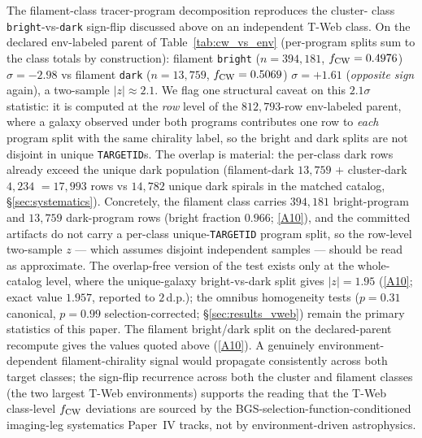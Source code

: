 \documentclass[aps,prd,twocolumn,superscriptaddress,showpacs,preprintnumbers,nofootinbib,longbibliography,floatfix]{revtex4-2}
\newcommand{\repoBase}{https://github.com/Hubify-Projects/bigbounce/blob/main}
\begin{document}
The filament-class tracer-program decomposition reproduces the cluster-
class \texttt{bright}-vs-\texttt{dark} sign-flip discussed above on an
independent T-Web class. On the declared env-labeled parent of
Table~\ref{tab:cw_vs_env} (per-program splits sum to the class totals
by construction): filament \texttt{bright} ($n = 394{,}181$,
$f_{\rm CW} = 0.4976$) $\sigma = -2.98$ vs filament \texttt{dark}
($n = 13{,}759$, $f_{\rm CW} = 0.5069$)
$\sigma = +1.61$ (\emph{opposite sign} again), a two-sample
$|z| \approx 2.1$. We flag one structural caveat on this $2.1\sigma$
statistic: it is computed at the \emph{row} level of the
$812{,}793$-row env-labeled parent, where a galaxy observed under
both programs contributes one row to \emph{each} program split with
the same chirality label, so the bright and dark splits are not
disjoint in unique \texttt{TARGETID}s. The overlap is material: the
per-class dark rows already exceed the unique dark population
(filament-dark $13{,}759$ $+$ cluster-dark $4{,}234$ $= 17{,}993$
rows vs $14{,}782$ unique dark spirals in the matched catalog,
\S\ref{sec:systematics}). Concretely, the filament class carries
$394{,}181$ bright-program and $13{,}759$ dark-program rows
(bright fraction $0.966$;
\href{\repoBase/pipelines/p5\_desi\_chirality/outputs/17\_v0151\_closure\_recomputes.json}{[A10]}),
and the committed artifacts do not carry a
per-class unique-\texttt{TARGETID} program split, so the row-level
two-sample $z$ — which assumes disjoint independent samples — should
be read as approximate. The overlap-free version of the test exists
only at the whole-catalog level, where the unique-galaxy
bright-vs-dark split gives $|z| = 1.95$
(\href{\repoBase/pipelines/p5\_desi\_chirality/outputs/17\_v0151\_closure\_recomputes.json}{[A10]};
exact value $1.957$, reported to $2$\,d.p.);
the omnibus homogeneity tests
($p = 0.31$ canonical, $p = 0.99$ selection-corrected;
\S\ref{sec:results_vweb}) remain the primary statistics of this
paper. The filament bright/dark split on the declared-parent recompute
gives the values quoted above
(\href{\repoBase/pipelines/p5\_desi\_chirality/outputs/17\_v0151\_closure\_recomputes.json}{[A10]}).
A genuinely environment-dependent
filament-chirality signal would propagate consistently across both
target classes; the sign-flip recurrence across both the cluster and
filament classes (the two largest T-Web environments) supports the
reading that the T-Web class-level $f_{\rm CW}$ deviations are sourced
by the BGS-selection-function-conditioned imaging-leg systematics
Paper~IV tracks, not by environment-driven astrophysics.
\end{document}
